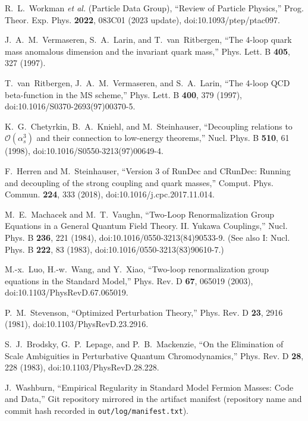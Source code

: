 \documentclass[epjc3]{svjour3}
\begin{document}
\bigskip
%
%
\begin{thebibliography}{99}
R.~L.~Workman \emph{et al.} (Particle Data Group),
``Review of Particle Physics,''
Prog. Theor. Exp. Phys. \textbf{2022}, 083C01 (2023 update),
doi:10.1093/ptep/ptac097.

J.~A.~M.~Vermaseren, S.~A.~Larin, and T.~van~Ritbergen,
``The 4-loop quark mass anomalous dimension and the invariant quark mass,''
Phys. Lett. B \textbf{405}, 327 (1997).

T.~van~Ritbergen, J.~A.~M.~Vermaseren, and S.~A.~Larin,
``The 4-loop QCD beta-function in the MS scheme,''
Phys. Lett. B \textbf{400}, 379 (1997),
doi:10.1016/S0370-2693(97)00370-5.

K.~G.~Chetyrkin, B.~A.~Kniehl, and M.~Steinhauser,
``Decoupling relations to $\mathcal{O}(\alpha_s^3)$ and their connection to low-energy theorems,''
Nucl. Phys. B \textbf{510}, 61 (1998),
doi:10.1016/S0550-3213(97)00649-4.

F.~Herren and M.~Steinhauser,
``Version 3 of RunDec and CRunDec: Running and decoupling of the strong coupling and quark masses,''
Comput. Phys. Commun. \textbf{224}, 333 (2018),
doi:10.1016/j.cpc.2017.11.014.

M.~E.~Machacek and M.~T.~Vaughn,
``Two-Loop Renormalization Group Equations in a General Quantum Field Theory. II. Yukawa Couplings,''
Nucl. Phys. B \textbf{236}, 221 (1984),
doi:10.1016/0550-3213(84)90533-9. (See also I: Nucl. Phys. B \textbf{222}, 83 (1983), doi:10.1016/0550-3213(83)90610-7.)

M.-x.~Luo, H.-w.~Wang, and Y.~Xiao,
``Two-loop renormalization group equations in the Standard Model,''
Phys. Rev. D \textbf{67}, 065019 (2003),
doi:10.1103/PhysRevD.67.065019.

P.~M.~Stevenson,
``Optimized Perturbation Theory,''
Phys. Rev. D \textbf{23}, 2916 (1981),
doi:10.1103/PhysRevD.23.2916.

S.~J.~Brodsky, G.~P.~Lepage, and P.~B.~Mackenzie,
``On the Elimination of Scale Ambiguities in Perturbative Quantum Chromodynamics,''
Phys. Rev. D \textbf{28}, 228 (1983),
doi:10.1103/PhysRevD.28.228.

J.~Washburn,
``Empirical Regularity in Standard Model Fermion Masses: Code and Data,''
Git repository mirrored in the artifact manifest (repository name and commit hash recorded in \texttt{out/log/manifest.txt}).
\end{thebibliography}
\end{document}
